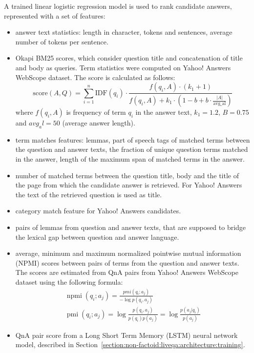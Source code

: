 A trained linear logistic regression model is used to rank candidate answers, represented with a set of features:
\begin{itemize}
\item answer text statistics: length in character, tokens and sentences, average number of tokens per sentence.
\item Okapi BM25 scores, which consider question title and concatenation of title and body as queries. Term statistics were computed on Yahoo! Answers WebScope dataset. The score is calculated as follows:
\begin{equation*}
\label{equation:bm25}
\text{score}(A,Q) = \sum_{i=1}^{n} \text{IDF}(q_i) \cdot \frac{f(q_i, A) \cdot (k_1 + 1)}{f(q_i, A) + k_1 \cdot (1 - b + b \cdot \frac{|A|}{\text{avg\_al}})}
\end{equation*}
where $f(q_i, A)$ is frequency of term $q_i$ in the answer text, $k_1=1.2$, $B=0.75$ and $avg_al=50$ (average answer length).
\item term matches features: lemmas, part of speech tags of matched terms between the question and answer texts, the fraction of unique question terms matched in the answer, length of the maximum span of matched terms in the answer.
\item number of matched terms between the question title, body and the title of the page from which the candidate answer is retrieved. For Yahoo! Answers the text of the retrieved question is used as title.
\item category match feature for Yahoo! Answers candidates.
\item pairs of lemmas from question and answer texts, that are supposed to bridge the lexical gap between question and answer language.
\item average, minimum and maximum normalized pointwise mutual information (NPMI) scores between pairs of terms from the question and answer texts. The scores are estimated from QnA pairs from Yahoo! Answers WebScope dataset using the following formula:
\begin{equation*}
\begin{split}
\operatorname{npmi}(q_i;a_j) = \frac{pmi(q_i;a_j)}{-\log p(q_i,a_j)}\\
\operatorname{pmi}(q_i;a_j) = \log\frac{p(q_i,a_j)}{p(q_i)p(a_j)} =  \log\frac{p(a_j|q_i)}{p(a_j)}
\end{split}
\end{equation*}
\item QnA pair score from a Long Short Term Memory (LSTM) neural network model, described in Section~\ref{section:non-factoid:liveqa:architecture:training}.
\end{itemize}

